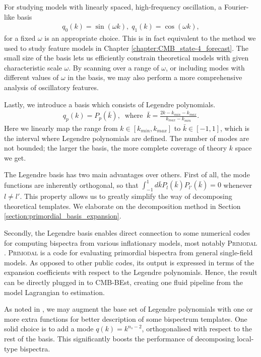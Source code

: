 For studying models with linearly spaced, high-frequency oscillation, a Fourier-like basis
\begin{align}
	q_0(k) = \sin (\omega k), \; q_1(k) = \cos (\omega k), \label{eqn:Fourier_basis}
\end{align}
for a fixed $\omega$ is an appropriate choice. This is in fact equivalent to the method we used to study feature models in Chapter \ref{chapter:CMB_state-4_forecast}. The small size of the basis lets us efficiently constrain theoretical models with given characteristic scale $\omega$. By scanning over a range of $\omega$, or including modes with different values of $\omega$ in the basis, we may also perform a more comprehensive analysis of oscillatory features.

Lastly, we introduce a basis which consists of Legendre polynomials.
\begin{align}
	q_p(k) = P_p(\bar{k}), \;\;\text{where}\;\; \bar{k} = \frac{2k-k_{min}-k_{max}}{k_{max}-k_{min}}.  \label{eqn:Legendre_basis_no_inv_k}
\end{align}
Here we linearly map the range from $k \in [k_{min},k_{max}]$ to $\bar{k} \in [-1,1]$, which is the interval where Legendre polynomials are defined. The number of modes are not bounded; the larger the basis, the more complete coverage of theory $k$ space we get.

The Legendre basis has two main advantages over others. First of all, the mode functions are inherently orthogonal, so that $\int_{-1}^{1} d\bar{k} P_{l}(\bar{k}) P_{l'}(\bar{k}) = 0$ whenever $l \neq l'$. This property allows us to greatly simplify the way of decomposing theoretical templates. We elaborate on the decomposition method in Section \ref{section:primordial_basis_expansion}. 

Secondly, the Legendre basis enables direct connection to some numerical codes for computing bispectra from various inflationary models, most notably \textsc{Primodal} \cite{Clarke2021}. \textsc{Primodal} is a code for evaluating primordial bispectra from general single-field models. As opposed to other public codes, its output is expressed in terms of the expansion coefficients with respect to the Legendre polynomials. Hence, the result can be directly plugged in to CMB-BEst, creating one fluid pipeline from the model Lagrangian to estimation.

As noted in \cite{Clarke2021}, we may augment the base set of Legendre polynomials with one or more extra functions for better description of some bispectrum templates. One solid choice is to add a mode $q(k) = k^{n_s -2}$, orthogonalised with respect to the rest of the basis. This significantly boosts the performance of decomposing local-type bispectra.

